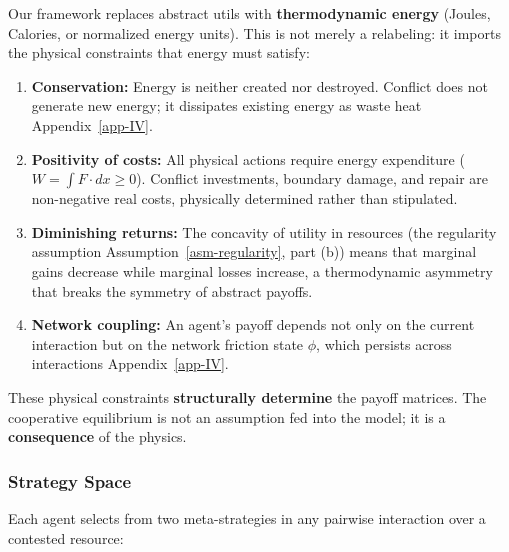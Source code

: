 \documentclass[11pt]{article}
\theoremstyle{plain}
\theoremstyle{definition}
\theoremstyle{remark}
\let\origsubsubsection\subsubsection
\renewcommand{\subsubsection}{\needspace{4\baselineskip}\origsubsubsection}
\providecommand{\tightlist}{%
  \setlength{\itemsep}{0pt}\setlength{\parskip}{0pt}}
\begin{document}
Our framework replaces abstract utils with \textbf{thermodynamic energy}
(Joules, Calories, or normalized energy units). This is not merely a
relabeling: it imports the physical constraints that energy must
satisfy:

\begin{enumerate}
\def\labelenumi{\arabic{enumi}.}
\tightlist
\item
  \textbf{Conservation:} Energy is neither created nor destroyed.
  Conflict does not generate new energy; it dissipates existing energy
  as waste heat Appendix~\ref{app-IV}.
\item
  \textbf{Positivity of costs:} All physical actions require energy
  expenditure (\(W = \int F \cdot dx \geq 0\)). Conflict investments,
  boundary damage, and repair are non-negative real costs, physically
  determined rather than stipulated.
\item
  \textbf{Diminishing returns:} The concavity of utility in resources
  (the regularity assumption Assumption~\ref{asm-regularity}, part (b))
  means that marginal gains decrease while marginal losses increase, a
  thermodynamic asymmetry that breaks the symmetry of abstract payoffs.
\item
  \textbf{Network coupling:} An agent's payoff depends not only on the
  current interaction but on the network friction state \(\phi\), which
  persists across interactions Appendix~\ref{app-IV}.
\end{enumerate}

These physical constraints \textbf{structurally determine} the payoff
matrices. The cooperative equilibrium is not an assumption fed into the
model; it is a \textbf{consequence} of the physics.

\subsubsection{Strategy Space}\label{strategy-space}

Each agent selects from two meta-strategies in any pairwise interaction
over a contested resource:
\end{document}
